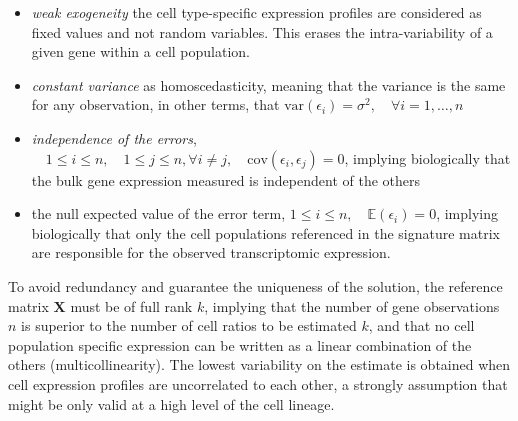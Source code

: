 \begin{itemize}

\item
  \emph{weak exogeneity} the cell type-specific expression profiles are
  considered as fixed values and not random variables. This erases the
  intra-variability of a given gene within a cell population.
\item
  \emph{constant variance} as homoscedasticity, meaning that the
  variance is the same for any observation, in other terms, that
  \(\text{var} \left(\epsilon_i\right)=\sigma^2, \quad \forall i =1, \ldots, n\)
\item
  \emph{independence of the errors},
  \(\quad 1 \le i \le n, \quad 1 \le j \le n, \forall i \neq j, \quad \text{cov} (\epsilon_i, \epsilon_j)=0\),
  implying biologically that the bulk gene expression measured is
  independent of the others
\item
  the null expected value of the error term,
  \(1 \le i \le n, \quad \mathbb{E}(\epsilon_i)=0\), implying
  biologically that only the cell populations referenced in the
  signature matrix are responsible for the observed transcriptomic
  expression.
\end{itemize}

To avoid redundancy and guarantee the uniqueness of the solution, the
reference matrix \(\boldsymbol{X}\) must be of full rank \(k\), implying
that the number of gene observations \(n\) is superior to the number of
cell ratios to be estimated \(k\), and that no cell population specific
expression can be written as a linear combination of the others
(multicollinearity). The lowest variability on the estimate is obtained
when cell expression profiles are uncorrelated to each other, a strongly
assumption that might be only valid at a high level of the cell lineage.

